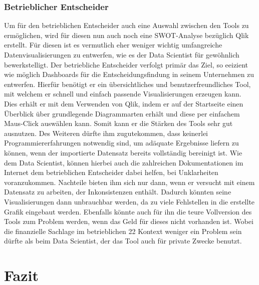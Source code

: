 \documentclass[12pt]{article}
\begin{document}
	\subsubsection{Betrieblicher Entscheider}
	
	Um für den betrieblichen Entscheider auch eine Auswahl zwischen den Tools zu
	ermöglichen, wird für diesen nun auch noch eine SWOT-Analyse bezüglich Qlik erstellt.
	Für diesen ist es vermutlich eher weniger wichtig umfangreiche Datenvisualisierungen
	zu entwerfen, wie es der Data Scientist für gewöhnlich bewerkstelligt. Der betriebliche
	Entscheider verfolgt primär das Ziel, so eeizient wie möglich Dashboards für die
	Entscheidungsfindung in seinem Unternehmen zu entwerfen.
	Hierfür benötigt er ein übersichtliches und benutzerfreundliches Tool, mit welchem er
	schnell und einfach passende Visualisierungen erzeugen kann. Dies erhält er mit dem
	Verwenden von Qlik, indem er auf der Startseite einen Überblick über grundlegende
	Diagrammarten erhält und diese per einfachem Maus-Click auswählen kann.
	Somit kann er die Stärken des Tools sehr gut ausnutzen.
	Des Weiteren dürfte ihm zugutekommen, dass keinerlei Programmiererfahrungen
	notwendig sind, um adäquate Ergebnisse liefern zu können, wenn der importierte
	Datensatz bereits vollständig bereinigt ist. Wie dem Data Scientist, können hierbei auch
	die zahlreichen Dokumentationen im Internet dem betrieblichen Entscheider dabei
	helfen, bei Unklarheiten voranzukommen.
	Nachteile bieten ihm sich nur dann, wenn er versucht mit einem Datensatz zu arbeiten,
	der Inkonsistenzen enthält. Dadurch könnten seine Visualisierungen dann unbrauchbar
	werden, da zu viele Fehlstellen in die erstellte Grafik eingebaut werden.
	Ebenfalls könnte auch für ihn die teure Vollversion des Tools zum Problem werden, wenn
	das Geld für dieses nicht vorhanden ist. Wobei die finanzielle Sachlage im betrieblichen
	22
	Kontext weniger ein Problem sein dürfte als beim Data Scientist, der das Tool auch für
	private Zwecke benutzt.
	
	\section{Fazit} %
	
\end{document}
